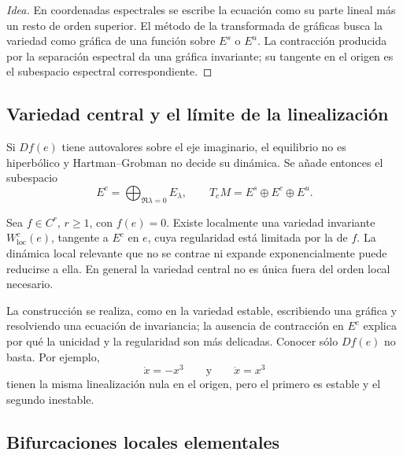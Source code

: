 \begin{proof}[Idea]
En coordenadas espectrales se escribe la ecuación como su parte lineal más un
resto de orden superior. El método de la transformada de gráficas busca la
variedad como gráfica de una función sobre \(E^s\) o \(E^u\). La contracción
producida por la separación espectral da una gráfica invariante; su tangente
en el origen es el subespacio espectral correspondiente.
\end{proof}



\subsection{Variedad central y el límite de la linealización}

Si \(Df(e)\) tiene autovalores sobre el eje imaginario, el equilibrio no es
hiperbólico y Hartman--Grobman no decide su dinámica. Se añade entonces el
subespacio
\begin{equation}
 E^c=\bigoplus_{\Re\lambda=0}E_\lambda,\qquad
 T_eM=E^s\oplus E^c\oplus E^u.
 \label{geo:eq:center-splitting}
\end{equation}

\begin{proposition}
Sea \(f\in C^r\), \(r\ge1\), con \(f(e)=0\). Existe localmente una variedad
invariante \(W^c_{\mathrm{loc}}(e)\), tangente a \(E^c\) en \(e\), cuya
regularidad está limitada por la de \(f\). La dinámica local relevante que no
se contrae ni expande exponencialmente puede reducirse a ella. En general la
variedad central no es única fuera del orden local necesario.
\end{proposition}

La construcción se realiza, como en la variedad estable, escribiendo una
gráfica y resolviendo una ecuación de invariancia; la ausencia de contracción
en \(E^c\) explica por qué la unicidad y la regularidad son más delicadas.
Conocer sólo \(Df(e)\) no basta. Por ejemplo,
\begin{equation}
 \dot x=-x^3
 \qquad\text{y}\qquad
 \dot x=x^3
 \label{geo:eq:center-counterexample}
\end{equation}
tienen la misma linealización nula en el origen, pero el primero es estable y
el segundo inestable.

\subsection{Bifurcaciones locales elementales}

